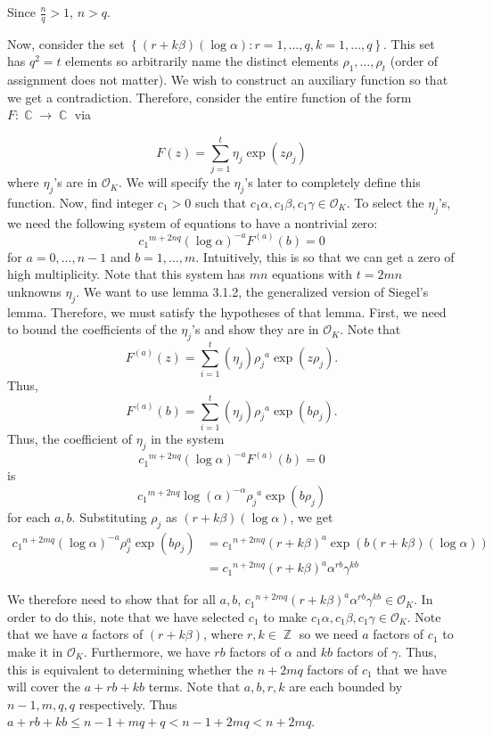 \documentclass[a4paper, 11pt]{book}
\DeclareMathOperator{\C}{\mathbb{C}}
\DeclareMathOperator{\Z}{\mathbb{Z}}
\begin{document}
{    Since $\frac{n}{q} > 1$, $n > q$.\par 
    Now, consider the set $\left\{(r + k\beta)(\log \alpha) : r = 1, \ldots, q, k = 1, \ldots, q\right\}$. This set has $q^2 = t$ elements so arbitrarily name the distinct elements $\rho_1, \ldots, \rho_t$ (order of assignment does not matter). We wish to construct an auxiliary function so that we get a contradiction. Therefore, consider the entire function of the form $F: \C \to \C$ via 

\[F(z) = \sum\limits_{j=1}^{t}\eta_{j}\exp(z\rho_j)\]
where $\eta_j$'s are in $\mathcal{O}_K$. We will specify the $\eta_j$'s later to completely define this function. Now, find integer $c_1 > 0$ such that $c_1 \alpha, c_1 \beta, c_1 \gamma \in \mathcal{O}_K$. To select the $\eta_j$'s, we need the following system of equations to have a nontrivial zero: 
    \[{c_1}^{m + 2nq} {(\log \alpha)}^{-a}F^{(a)}(b) = 0\]
    for $a = 0, \ldots, n-1$ and $b = 1, \ldots, m$. Intuitively, this is so that we can get a zero of high multiplicity. Note that this system has $mn$ equations with $t = 2mn$ unknowns $\eta_j$. We want to use lemma 3.1.2, the generalized version of Siegel's lemma. Therefore, we must satisfy the hypotheses of that lemma. First, we need to bound the coefficients of the $\eta_j$'s and show they are in $\mathcal{O}_K$. Note that \[F^{(a)}(z) = \sum\limits_{i=1}^{t}(\eta_j){\rho_j}^{a}\exp(z\rho_j).\] Thus, \[F^{(a)}(b) = \sum\limits_{i=1}^{t}(\eta_j){\rho_j}^{a}\exp(b\rho_j).\] Thus, the coefficient of $\eta_j$ in the system \[{c_1}^{m + 2nq} {(\log \alpha)}^{-a}F^{(a)}(b) = 0\] is \[{c_1}^{m + 2nq} {\log(\alpha)}^{-\alpha}{\rho_j}^{a}\exp(b\rho_j)\] for each $a, b$. Substituting $\rho_j$ as $(r+k\beta)(\log \alpha)$, we get 
\begin{align*}
    {c_1}^{n+2mq}{(\log \alpha)}^{-a}\rho_j^{a}\exp(b\rho_j) &= {c_1}^{n+2mq}{(r + k\beta)}^{a}\exp\left(b(r+k\beta)(\log \alpha)\right) \\
                                                                &= {c_1}^{n+2mq}{(r+k\beta)}^{a}{\alpha}^{rb}\gamma^{kb}
\end{align*}

We therefore need to show that for all $a, b$, ${c_1}^{n+2mq}{(r+k\beta)}^{a}{\alpha}^{rb}\gamma^{kb} \in \mathcal{O}_K$. In order to do this, note that we have selected $c_1$ to make $c_1\alpha, c_1\beta, c_1\gamma \in \mathcal{O}_K$. Note that we have $a$ factors of $(r + k \beta)$, where $r, k \in \Z$ so we need $a$ factors of $c_1$ to make it in $\mathcal{O}_K$. Furthermore, we have $rb$ factors of $\alpha$ and $kb$ factors of $\gamma$. Thus, this is equivalent to determining whether the $n + 2mq$ factors of $c_1$ that we have will cover the $a + rb + kb$ terms. Note that $a, b, r, k$ are each bounded by $n-1, m, q, q$ respectively. Thus $a + rb + kb \leq n-1 + mq + q < n-1 + 2mq < n + 2mq$.\par

}
\end{document}
